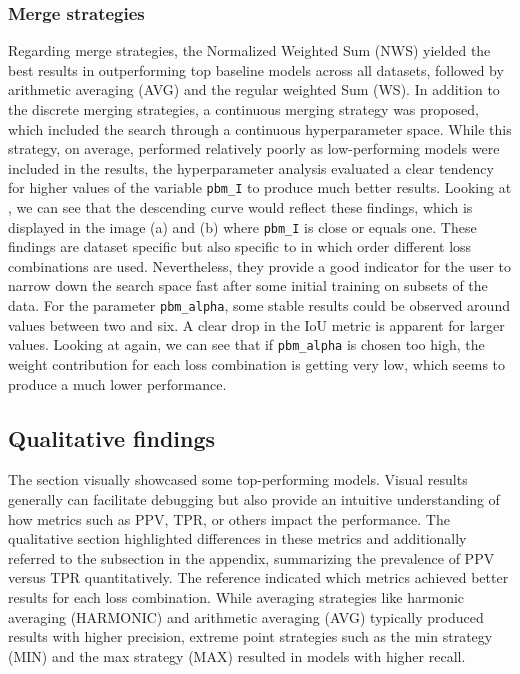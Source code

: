 \subsubsection*{Merge strategies}
Regarding merge strategies, the Normalized Weighted Sum (NWS) yielded the best results in outperforming top baseline models across all datasets, followed by arithmetic averaging (AVG) and the regular weighted Sum (WS). In addition to the discrete merging strategies, a continuous merging strategy was proposed, which included the search through a continuous hyperparameter space. While this strategy, on average, performed relatively poorly as low-performing models were included in the results, the hyperparameter analysis evaluated a clear tendency for higher values of the variable \texttt{pbm\_I} to produce much better results. Looking at , we can see that the descending curve would reflect these findings, which is displayed in the image (a) and (b) where \texttt{pbm\_I} is close or equals one. These findings are dataset specific but also specific to in which order different loss combinations are used. Nevertheless, they provide a good indicator for the user to narrow down the search space fast after some initial training on subsets of the data. For the parameter \texttt{pbm\_alpha}, some stable results could be observed around values between two and six. A clear drop in the \ac{IoU} metric is apparent for larger values. Looking at  again, we can see that if \texttt{pbm\_alpha} is chosen too high, the weight contribution for each loss combination is getting very low, which seems to produce a much lower performance.

\subsection{Qualitative findings}
The  section visually showcased some top-performing models. Visual results generally can facilitate debugging but also provide an intuitive understanding of how metrics such as \ac{PPV}, \ac{TPR}, or others impact the performance. The qualitative section highlighted differences in these metrics and additionally referred to the subsection  in the appendix, summarizing the prevalence of \ac{PPV} versus \ac{TPR} quantitatively. The reference indicated which metrics achieved better results for each loss combination. While averaging strategies like harmonic averaging (HARMONIC) and arithmetic averaging (AVG) typically produced results with higher precision, extreme point strategies such as the min strategy (MIN) and the max strategy (MAX) resulted in models with higher recall.

